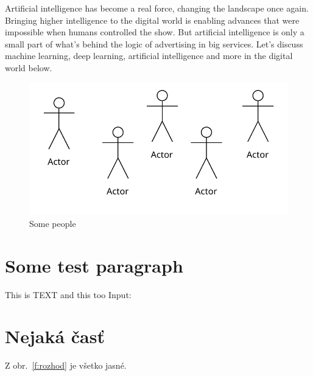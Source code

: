 \documentclass[10pt,twoside,a4paper,english]{article}
\begin{document}
	Artificial intelligence has become a real force, changing the landscape once again. Bringing higher intelligence to the digital world is enabling advances that were impossible when humans controlled the show. But artificial intelligence is only a small part of what's behind the logic of advertising in big services. Let's discuss machine learning, deep learning, artificial intelligence and more in the digital world below.\cite{10314235}\par

	\endgroup

	\begin{figure}[tbh]
		\centering
		\includegraphics[scale=0.7]{diagram_test1.pdf}
		\caption{Some people}
	\end{figure}

	\section{Some test paragraph}
	This is TEXT and this too \newline
	Input: 


	\section{Nejaká časť} \label{nejaka}

	Z obr.~\ref{f:rozhod} je všetko jasné.
\end{document}

